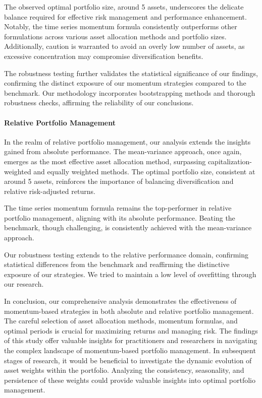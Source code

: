 \documentclass{article}
\begin{document}
The observed optimal portfolio size, around 5 assets, underscores the delicate balance required for effective risk management and performance enhancement. Notably, the time series momentum formula consistently outperforms other formulations across various asset allocation methods and portfolio sizes. Additionally, caution is warranted to avoid an overly low number of assets, as excessive concentration may compromise diversification benefits.\newline

The robustness testing further validates the statistical significance of our findings, confirming the distinct exposure of our momentum strategies compared to the benchmark. Our methodology incorporates bootstrapping methods and thorough robustness checks, affirming the reliability of our conclusions.\newline

\paragraph{Relative Portfolio Management}
In the realm of relative portfolio management, our analysis extends the insights gained from absolute performance. The mean-variance approach, once again, emerges as the most effective asset allocation method, surpassing capitalization-weighted and equally weighted methods. The optimal portfolio size, consistent at around 5 assets, reinforces the importance of balancing diversification and relative risk-adjusted returns.\newline

The time series momentum formula remains the top-performer in relative portfolio management, aligning with its absolute performance. Beating the benchmark, though challenging, is consistently achieved with the mean-variance approach.\newline

Our robustness testing extends to the relative performance domain, confirming statistical differences from the benchmark and reaffirming the distinctive exposure of our strategies. We tried to maintain 
a low level of overfitting through our research.\newline


In conclusion, our comprehensive analysis demonstrates the effectiveness of momentum-based strategies in both absolute and relative portfolio management. The careful selection of asset allocation methods, momentum formulas, and optimal periods is crucial for maximizing returns and managing risk. The findings of this study offer valuable insights for practitioners and researchers in navigating the complex landscape of momentum-based portfolio management.
In subsequent stages of research, it would be beneficial to investigate the dynamic evolution of asset weights within the portfolio. Analyzing the consistency, seasonality, and persistence of these weights could provide valuable insights into optimal portfolio management.
\end{document}

